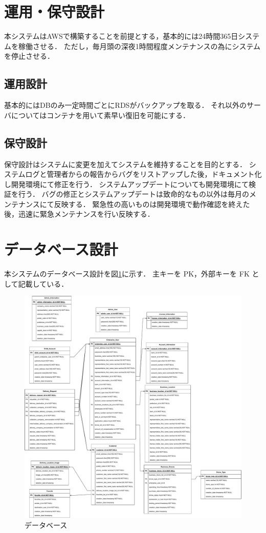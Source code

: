 \documentclass[a4paper, titlepage]{jsarticle}
\begin{document}
\section{運用・保守設計}
本システムはAWSで構築することを前提とする，基本的には24時間365日システムを稼働させる．
ただし，毎月頭の深夜1時間程度メンテナンスの為にシステムを停止させる．
\subsection{運用設計}
基本的にはDBのみ一定時間ごとにRDSがバックアップを取る．
それ以外のサーバについてはコンテナを用いて素早い復旧を可能にする．

\subsection{保守設計}
保守設計はシステムに変更を加えてシステムを維持することを目的とする．
システムログと管理者からの報告からバグをリストアップした後，ドキュメント化し開発環境にて修正を行う．
システムアップデートについても開発環境にて検証を行う．
バグの修正とシステムアップデートは致命的なもの以外は毎月のメンテナンスにて反映する．
緊急性の高いものは開発環境で動作確認を終えた後，迅速に緊急メンテナンスを行い反映する．
\clearpage
\section{データベース設計}
本システムのデータベース設計を図\ref{fig:database}に示す．
主キーを PK，外部キーを FK として記載している．
\begin{figure}[H]
  \centering
  \includegraphics[width=\textwidth]{other/database.pdf}
  \caption{データベース}
  \label{fig:database}
\end{figure}
\end{document}
